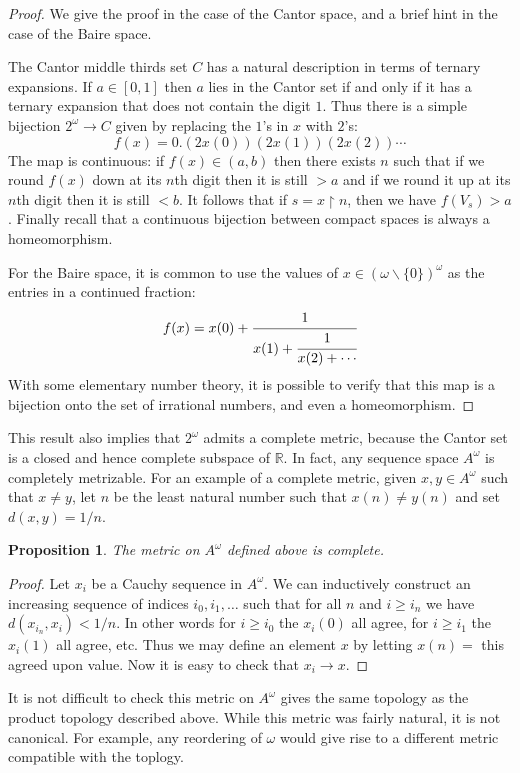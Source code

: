 \documentclass[11pt,oneside,a4paper]{amsbook}
\newcommand{\R}{\mathbb R}
\theoremstyle{definition}
\theoremstyle{plain}
\newtheorem{proposition}[theorem]{Proposition}
\theoremstyle{definition}
\theoremstyle{remark}
\numberwithin{equation}{section}
\numberwithin{figure}{section}
\begin{document}
\begin{proof}
  We give the proof in the case of the Cantor space, and a brief hint in the case of the Baire space.

  The Cantor middle thirds set $C$ has a natural description in terms of ternary expansions. If $a\in[0,1]$ then $a$ lies in the Cantor set if and only if it has a ternary expansion that does not contain the digit $1$. Thus there is a simple bijection $2^\omega\to C$ given by replacing the $1$'s in $x$ with $2$'s:
  \[f(x)=0.(2x(0))(2x(1))(2x(2))\cdots
  \]
  The map is continuous: if $f(x)\in(a,b)$ then there exists $n$ such that if we round $f(x)$ down at its $n$th digit then it is still $>a$ and if we round it up at its $n$th digit then it is still $<b$. It follows that if $s=x\restriction n$, then we have $f(V_s)>a$. Finally recall that a continuous bijection between compact spaces is always a homeomorphism.

  For the Baire space, it is common to use the values of $x\in(\omega\smallsetminus\{0\})^\omega$ as the entries in a continued fraction:
  \[f(x)=x(0)+\cfrac{1}{x(1)+\cfrac{1}{x(2)+\cdots}}
  \]
  With some elementary number theory, it is possible to verify that this map is a bijection onto the set of irrational numbers, and even a homeomorphism.
\end{proof}

This result also implies that $2^\omega$ admits a complete metric, because the Cantor set is a closed and hence complete subspace of $\R$. In fact, any sequence space $A^\omega$ is completely metrizable. For an example of a complete metric, given $x,y\in A^\omega$ such that $x\neq y$, let $n$ be the least natural number such that $x(n)\neq y(n)$ and set $d(x,y)=1/n$.

\begin{proposition}
  The metric on $A^\omega$ defined above is complete.
\end{proposition}

\begin{proof}
  Let $x_i$ be a Cauchy sequence in $A^\omega$. We can inductively construct an increasing sequence of indices $i_0,i_1,\ldots$ such that for all $n$ and $i\geq i_n$ we have $d(x_{i_n},x_i)<1/n$. In other words for $i\geq i_0$ the $x_i(0)$ all agree, for $i\geq i_1$ the $x_i(1)$ all agree, etc. Thus we may define an element $x$ by letting $x(n)=$ this agreed upon value. Now it is easy to check that $x_i\to x$.
\end{proof}

It is not difficult to check this metric on $A^\omega$ gives the same topology as the product topology described above. While this metric was fairly natural, it is not canonical. For example, any reordering of $\omega$ would give rise to a different metric compatible with the toplogy.
\end{document}
